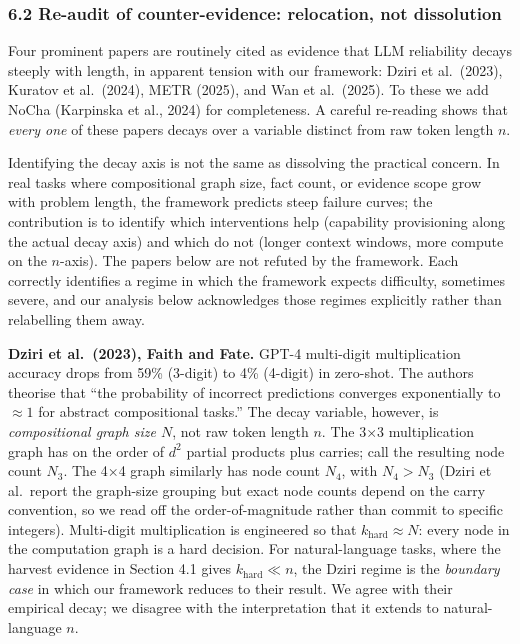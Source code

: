 \documentclass[
]{article}
\begin{document}
\subsubsection{6.2 Re-audit of counter-evidence: relocation, not
dissolution}\label{re-audit-of-counter-evidence-relocation-not-dissolution}

Four prominent papers are routinely cited as evidence that LLM
reliability decays steeply with length, in apparent tension with our
framework: Dziri et al.~(2023), Kuratov et al.~(2024), METR (2025), and
Wan et al.~(2025). To these we add NoCha (Karpinska et al., 2024) for
completeness. A careful re-reading shows that \emph{every one} of these
papers decays over a variable distinct from raw token length \(n\).

Identifying the decay axis is not the same as dissolving the practical
concern. In real tasks where compositional graph size, fact count, or
evidence scope grow with problem length, the framework predicts steep
failure curves; the contribution is to identify which interventions help
(capability provisioning along the actual decay axis) and which do not
(longer context windows, more compute on the \(n\)-axis). The papers
below are not refuted by the framework. Each correctly identifies a
regime in which the framework expects difficulty, sometimes severe, and
our analysis below acknowledges those regimes explicitly rather than
relabelling them away.

\textbf{Dziri et al.~(2023), Faith and Fate.} GPT-4 multi-digit
multiplication accuracy drops from 59\% (3-digit) to 4\% (4-digit) in
zero-shot. The authors theorise that ``the probability of incorrect
predictions converges exponentially to \(\approx 1\) for abstract
compositional tasks.'' The decay variable, however, is
\emph{compositional graph size \(N\)}, not raw token length \(n\). The
3×3 multiplication graph has on the order of \(d^2\) partial products
plus carries; call the resulting node count \(N_3\). The 4×4 graph
similarly has node count \(N_4\), with \(N_4 > N_3\) (Dziri et
al.~report the graph-size grouping but exact node counts depend on the
carry convention, so we read off the order-of-magnitude rather than
commit to specific integers). Multi-digit multiplication is engineered
so that \(k_{\text{hard}} \approx N\): every node in the computation
graph is a hard decision. For natural-language tasks, where the harvest
evidence in Section 4.1 gives \(k_{\text{hard}} \ll n\), the Dziri
regime is the \emph{boundary case} in which our framework reduces to
their result. We agree with their empirical decay; we disagree with the
interpretation that it extends to natural-language \(n\).
\end{document}
